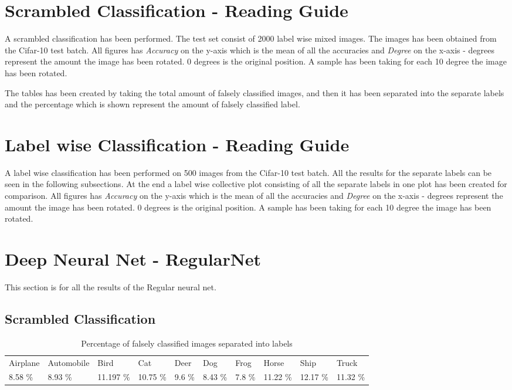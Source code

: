 \section{Scrambled Classification - Reading Guide}
A scrambled classification has been performed. The test set consist of 2000 label wise mixed images. The images has been obtained from the Cifar-10 test batch.
All figures has \emph{Accuracy} on the y-axis which is the mean of all the accuracies and \emph{Degree} on the x-axis - degrees represent the amount the image has been rotated. 0 degrees is the original position. A sample has been taking for each 10 degree the image has been rotated.

The tables has been created by taking the total amount of falsely classified images, and then it has been separated into the separate labels and the percentage which is shown represent the amount of falsely classified label.

\section{Label wise Classification - Reading Guide}
A label wise classification has been performed on 500 images from the Cifar-10 test batch. All the results for the separate labels can be seen in the following subsections. At the end a label wise collective plot consisting of all the separate labels in one plot has been created for comparison.
All figures has \emph{Accuracy} on the y-axis which is the mean of all the accuracies and \emph{Degree} on the x-axis - degrees represent the amount the image has been rotated. 0 degrees is the original position. A sample has been taking for each 10 degree the image has been rotated.

\section{Deep Neural Net - RegularNet}
This section is for all the results of the Regular neural net.
\subsection{Scrambled Classification}
\FloatBarrier

\begin{table}[]
	\centering
	\caption{Percentage of falsely classified images separated into labels }
	\label{table:falseclasReg}
	\begin{tabular}{llllllllll}
		Airplane & Automobile & Bird     & Cat    & Deer     & Dog     & Frog   & Horse    & Ship         & Truck         \\
		8.58 \%  & 8.93 \%    & 11.197 \% & 10.75 \% & 9.6 \% & 8.43 \% & 7.8 \% & 11.22 \% & 12.17 \% & 11.32 \%
	\end{tabular}
\end{table}
\FloatBarrier
